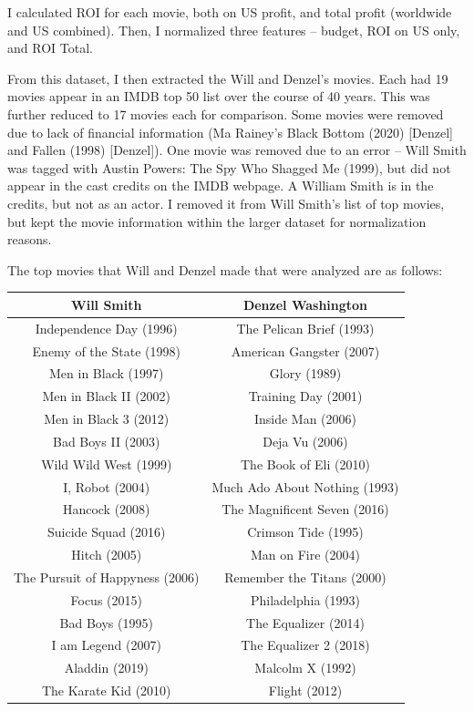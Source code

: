 \documentclass[]{article}
\begin{document}
I calculated ROI for each movie, both on US profit, and total profit
(worldwide and US combined). Then, I normalized three features --
budget, ROI on US only, and ROI Total.

From this dataset, I then extracted the Will and Denzel's movies. Each
had 19 movies appear in an IMDB top 50 list over the course of 40 years.
This was further reduced to 17 movies each for comparison. Some movies
were removed due to lack of financial information (Ma Rainey's Black
Bottom (2020) {[}Denzel{]} and Fallen (1998) {[}Denzel{]}). One movie
was removed due to an error -- Will Smith was tagged with Austin Powers:
The Spy Who Shagged Me (1999), but did not appear in the cast credits on
the IMDB webpage. A William Smith is in the credits, but not as an
actor. I removed it from Will Smith's list of top movies, but kept the
movie information within the larger dataset for normalization reasons.

The top movies that Will and Denzel made that were analyzed are as
follows:

\vspace{10mm}
\begin{tabular}{c c}
  Will Smith & Denzel Washington \\
  \hline
  Independence Day (1996) & The Pelican Brief (1993) \\
  Enemy of the State (1998) & American Gangster (2007) \\
  Men in Black (1997) & Glory (1989) \\
  Men in Black II (2002) & Training Day (2001) \\
  Men in Black 3 (2012) & Inside Man (2006) \\
  Bad Boys II (2003) & Deja Vu (2006) \\
  Wild Wild West (1999) & The Book of Eli (2010) \\
  I, Robot (2004) & Much Ado About Nothing (1993) \\
  Hancock (2008) & The Magnificent Seven (2016) \\
  Suicide Squad (2016) & Crimson Tide (1995) \\
  Hitch (2005) & Man on Fire (2004) \\
  The Pursuit of Happyness (2006) & Remember the Titans (2000) \\
  Focus (2015) & Philadelphia (1993) \\
  Bad Boys (1995) & The Equalizer (2014) \\
  I am Legend (2007) & The Equalizer 2 (2018) \\
  Aladdin (2019) & Malcolm X (1992) \\
  The Karate Kid (2010) & Flight (2012) 
  
\end{tabular}
\end{document}
